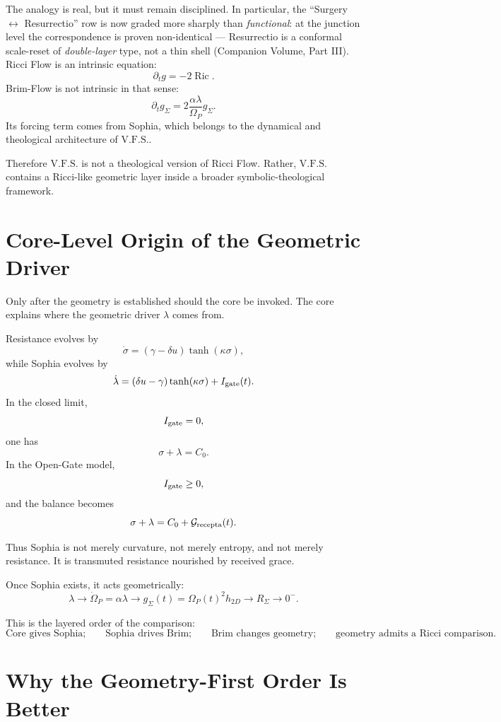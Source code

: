 \documentclass[11pt]{article}
\newcommand{\VFS}{\ensuremath{\mathrm{V.F.S.}}}
\newcommand{\Ric}{\operatorname{Ric}}
\newcommand{\Grec}{\mathcal G_{\rm recepta}}
\begin{document}
The analogy is real, but it must remain disciplined. In particular, the ``Surgery \(\leftrightarrow\)
Resurrectio'' row is now graded more sharply than \emph{functional}: at the junction level the
correspondence is proven non-identical --- Resurrectio is a conformal scale-reset of \emph{double-layer}
type, not a thin shell (Companion Volume, Part III). Ricci Flow is an intrinsic equation:
\[
 \partial_tg=-2\Ric.
\]
Brim-Flow is not intrinsic in that sense:
\[
 \partial_tg_{\Sigma}
 =
 2\frac{\alpha\lambda}{\Omega_P}g_{\Sigma}.
\]
Its forcing term comes from Sophia, which belongs to the dynamical and theological architecture of \VFS{}.

Therefore \VFS{} is not a theological version of Ricci Flow. Rather, \VFS{} contains a Ricci-like geometric layer inside a broader symbolic-theological framework.

\section{Core-Level Origin of the Geometric Driver}

Only after the geometry is established should the core be invoked. The core explains where the geometric driver \(\lambda\) comes from.

Resistance evolves by
\[
 \dot\sigma
 =
 (\gamma-\delta u)\tanh(\kappa\sigma),
\]
while Sophia evolves by
\[
 \dot\lambda
 =
 (\delta u-\gamma)\tanh(\kappa\sigma)
 +
 I_{\rm gate}(t).
\]
In the closed limit,
\[
 I_{\rm gate}=0,
\]
one has
\[
 \sigma+\lambda=C_0.
\]
In the Open-Gate model,
\[
 I_{\rm gate}\ge0,
\]
and the balance becomes
\[
 \sigma+\lambda=C_0+\Grec(t).
\]

Thus Sophia is not merely curvature, not merely entropy, and not merely resistance. It is transmuted resistance nourished by received grace.

Once Sophia exists, it acts geometrically:
\[
 \lambda
 \longrightarrow
 \dot\Omega_P=\alpha\lambda
 \longrightarrow
 g_{\Sigma}(t)=\Omega_P(t)^2h_{2D}
 \longrightarrow
 R_{\Sigma}\to0^-.
\]

This is the layered order of the comparison:
\[
 \text{Core gives Sophia;}
 \qquad
 \text{Sophia drives Brim;}
 \qquad
 \text{Brim changes geometry;}
 \qquad
 \text{geometry admits a Ricci comparison.}
\]

\section{Why the Geometry-First Order Is Better}
\end{document}
